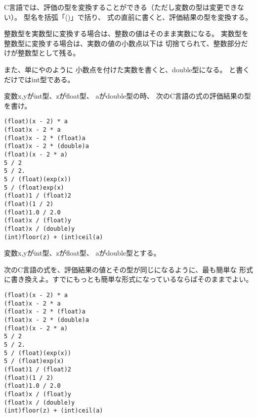 \documentclass[12pt,a4j]{jarticle}
\newcounter{toi}
\def\toi{%
\bigskip\bigskip\noindent
\addtocounter{toi}{1}
\shadowbox{\bfseries\large 問\thetoi}
\nopagebreak[4]\bigskip\nopagebreak[4]
}
\begin{document}
\toi

C言語では、評価の型を変換することができる（ただし変数の型は変更できない）。
型名を括弧「{\ttfamily ()}」で括り、
式の直前に書くと、評価結果の型を変換する。

整数型を実数型に変換する場合は、整数の値はそのまま実数になる。
実数型を整数型に変換する場合は、実数の値の小数点以下は
切捨てられて、整数部分だけが整数型として残る。

また、単に{}や{}のように
小数点を付けた実数を書くと、double型になる。
{}と書くだけではint型である。




変数{\ttfamily x,y}がint型、{\ttfamily z}がfloat型、
{\ttfamily a}がdouble型の時、
次のC言語の式の評価結果の型を書け。
\begin{verbatim}
(float)(x - 2) * a
(float)x - 2 * a
(float)x - 2 * (float)a
(float)x - 2 * (double)a
(float)(x - 2 * a)
5 / 2
5 / 2.
5 / (float)(exp(x))
5 / (float)exp(x)
(float)1 / (float)2
(float)(1 / 2)
(float)1.0 / 2.0
(float)x / (float)y
(float)x / (double)y
(int)floor(z) + (int)ceil(a)
\end{verbatim}





\newpage


\toi

変数{\ttfamily x,y}がint型、{\ttfamily z}がfloat型、
{\ttfamily a}がdouble型とする。

次のC言語の式を、評価結果の値とその型が同じになるように、最も簡単な
形式に書き換えよ。すでにもっとも簡単な形式になっているならばそのままでよい。


\begin{verbatim}
(float)(x - 2) * a
(float)x - 2 * a
(float)x - 2 * (float)a
(float)x - 2 * (double)a
(float)(x - 2 * a)
5 / 2
5 / 2.
5 / (float)(exp(x))
5 / (float)exp(x)
(float)1 / (float)2
(float)(1 / 2)
(float)1.0 / 2.0
(float)x / (float)y
(float)x / (double)y
(int)floor(z) + (int)ceil(a)
\end{verbatim}
\end{document}
